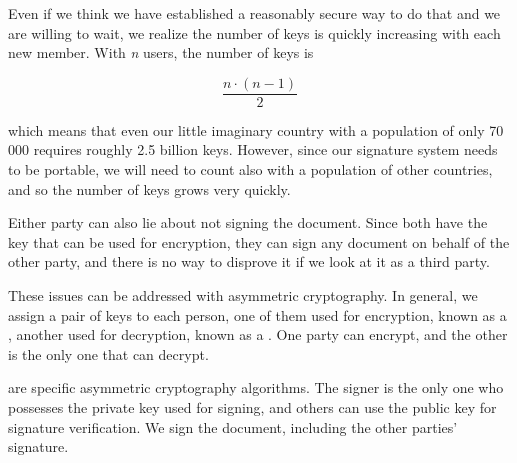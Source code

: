 \documentclass[thesismargins, english, thesislinespacing, onelinechapterstyle, upjsfrontpage]{rnthesis}
\begin{document}
Even if we think we have established a reasonably secure way to do that and we are willing to wait, we realize the number of keys is quickly increasing with each new member. With \textit{n} users, the number of keys is

$$\frac{n \cdot (n - 1)}{2}$$

which means that even our little imaginary country with a population of only 70 000 requires roughly 2.5 billion keys. However, since our signature system needs to be portable, we will need to count also with a population of other countries, and so the number of keys grows very quickly.

\iffalse %
\begin{figure}[!htb]
  \centering

  \begin{tikzpicture}
    \datavisualization [scientific axes=clean, visualize as smooth line, all axes={ticks={major={at={}}}}, y axis={label={number of keys}}, x axis={label={number of users}}]
    data [format=function] {
      var x : interval [2:125];
      func y = \value x*\value x;
    };
  \end{tikzpicture}

  \centerline{\parbox{13cm}{\sl \caption{Cubic growth of the number of keys.}}}
\end{figure}
\fi

Either party can also lie about not signing the document.
Since both have the key that can be used for encryption, they can sign any document on behalf of the other party, and there is no way to disprove it if we look at it as a third party.

These issues can be addressed with asymmetric cryptography.
In general, we assign a pair of keys to each person, one of them used for encryption, known as a , another used for decryption, known as a .
One party can encrypt, and the other is the only one that can decrypt.

 are specific asymmetric cryptography algorithms.
The signer is the only one who possesses the private key used for signing, and others can use the public key for signature verification.
We sign the document, including the other parties' signature.

\iffalse %
\obrazok{./figures/digital-signature-scheme}{Principle of digital signatures which involves signing and verifying a message (Paar 2009). TODO: I don't have rights to this image!!!}{pubkey-scheme}
\fi
\end{document}
